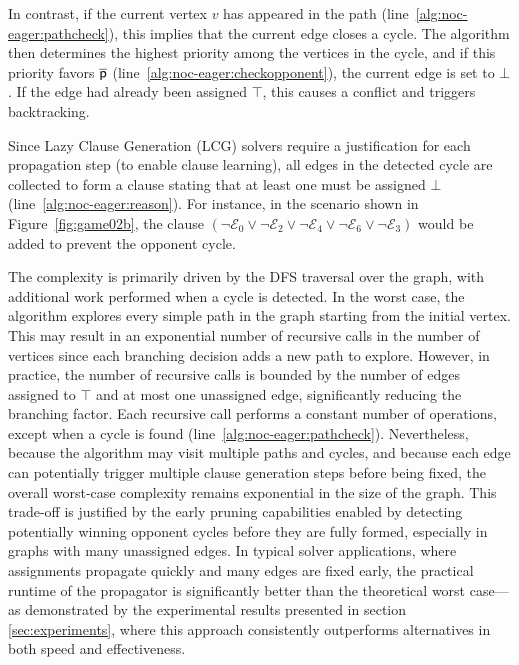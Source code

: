 \documentclass[runningheads]{llncs}
\begin{document}
In contrast, if the current vertex $v$ has appeared in the path (line~\ref{alg:noc-eager:pathcheck}), this implies that the current edge closes a cycle. The algorithm then determines the highest priority among the vertices in the cycle, and if this priority favors $\overline{\mathsf{p}}$ (line~\ref{alg:noc-eager:checkopponent}), the current edge is set to $\bot$. If the edge had already been assigned $\top$, this causes a conflict and triggers backtracking.

Since Lazy Clause Generation (LCG) solvers require a justification for each propagation step (to enable clause learning), all edges in the detected cycle are collected to form a clause stating that at least one must be assigned $\bot$ (line~\ref{alg:noc-eager:reason}). For instance, in the scenario shown in Figure~\ref{fig:game02b}, the clause $(\neg \mathcal{E}_0 \vee \neg \mathcal{E}_2 \vee \neg \mathcal{E}_4 \vee \neg \mathcal{E}_6 \vee \neg \mathcal{E}_3)$ would be added to prevent the opponent cycle.

The complexity \noceager is primarily driven by the DFS traversal over the graph, with additional work performed when a cycle is detected. In the worst case, the algorithm explores every simple path in the graph starting from the initial vertex. This may result in an exponential number of recursive calls in the number of vertices since each branching decision adds a new path to explore. However, in practice, the number of recursive calls is bounded by the number of edges assigned to $\top$ and at most one unassigned edge, significantly reducing the branching factor. Each recursive call performs a constant number of operations, except when a cycle is found (line~\ref{alg:noc-eager:pathcheck}). Nevertheless, because the algorithm may visit multiple paths and cycles, and because each edge can potentially trigger multiple clause generation steps before being fixed, the overall worst-case complexity remains exponential in the size of the graph. This trade-off is justified by the early pruning capabilities enabled by detecting potentially winning opponent cycles before they are fully formed, especially in graphs with many unassigned edges.
%
In typical solver applications, where assignments propagate quickly and many edges are fixed early, the practical runtime of the propagator is significantly better than the theoretical worst case—as demonstrated by the experimental results presented in section \ref{sec:experiments}, where this approach consistently outperforms alternatives in both speed and effectiveness.
\end{document}
